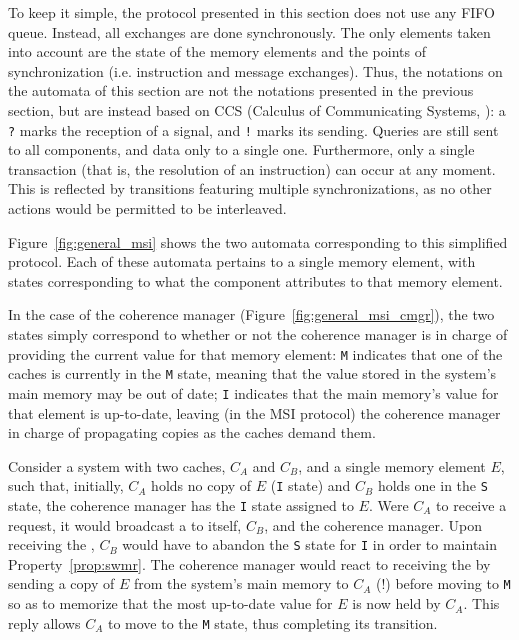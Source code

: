 To keep it simple, the protocol presented in this section does not use any FIFO
queue. Instead, all exchanges are done synchronously. The only elements taken
into account are the state of the memory elements and the points of
synchronization (i.e. instruction and message exchanges). Thus, the notations
on the automata of this section are not the notations presented in the previous
section, but are instead based on CCS (Calculus of Communicating Systems,
\cite{10.5555/539036}): a \texttt{?} marks the reception of a signal, and
\texttt{!} marks its sending.  Queries are still sent to all components, and
data only to a single one.  Furthermore, only a single transaction (that is,
the resolution of an instruction) can occur at any
moment. This is reflected by transitions featuring multiple synchronizations,
as no other actions would be permitted to be interleaved.

Figure~\ref{fig:general_msi} shows the two automata corresponding to this
simplified protocol. Each of these automata pertains to a single memory element,
with states corresponding to what the component attributes to that memory
element.

In the case of the coherence manager (Figure~\ref{fig:general_msi_cmgr}), the
two states simply correspond to whether or not the coherence manager is in
charge of providing the current value for that memory element: \texttt{M}
indicates that one of the caches is currently in the \texttt{M} state, meaning
that the value stored in the system's main memory may be out of date; \texttt{I}
indicates that the main memory's value for that element is up-to-date, leaving
(in the MSI protocol) the coherence manager in charge of propagating copies
as the caches demand them.

\begin{example}
\label{ex:general_msi_single_store}
Consider a system with two caches, $C_A$ and $C_B$, and a single memory
element $E$, such that, initially, $C_A$ holds no copy of $E$ (\texttt{I}
state) and $C_B$ holds one in the \texttt{S} state, the coherence manager
has the \texttt{I} state assigned to $E$. Were $C_A$ to receive a \storeinstr{}
request, it would broadcast a \getmquery{} to itself, $C_B$, and the coherence
manager. Upon receiving the \getmquery{}, $C_B$ would have to abandon the
\texttt{S} state for \texttt{I} in order to maintain Property~\ref{prop:swmr}.
The coherence manager would react to receiving the \getmquery{} by sending a
copy of $E$ from the system's main memory to $C_A$ (\simpledata!)
before moving to \texttt{M} so as to memorize that the most up-to-date value
for $E$ is now held by $C_A$. This \simpledata{} reply allows $C_A$ to move to
the \texttt{M} state, thus completing its transition.
\end{example}


